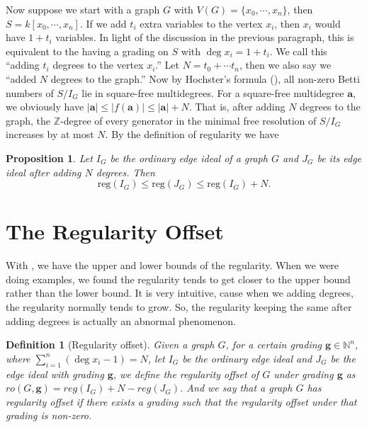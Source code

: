 \documentclass[dvipsnames,10pt]{article}
\newtheorem{proposition}[theorem]{Proposition}
\newtheorem{defi}[theorem]{Definition}
\begin{document}
Now suppose we start with a graph $G$ with $V(G)=\{x_0,\cdots,x_n\}$, then $S=k[x_0,\cdots,x_n]$. If we add $t_i$ extra variables to the vertex $x_i$, then $x_i$ would have $1+t_i$ variables. In light of the discussion in the previous paragraph, this is equivalent to the having a grading on $S$ with $\deg x_i=1+t_i$. We call this ``adding $t_i$ degrees to the vertex $x_i$.'' Let $N=t_0+\cdots t_n$, then we also say we ``added $N$ degrees to the graph.'' Now by Hochster's formula (), all non-zero Betti numbers of $S/I_G$ lie in square-free multidegrees. For a square-free multidegree $\mathbf{a}$, we obviously have $|\mathbf{a}|\leqslant|f(\mathbf{a})| \leqslant |\mathbf{a}| + N$. That is, after adding $N$ degrees to the graph, the $\mathbb{Z}$-degree of every generator in the minimal free resolution of $S/I_G$ increases by at most $N$. By the definition of regularity we have

\begin{proposition}
    Let $I_G$ be the ordinary edge ideal of a graph $G$ and $J_G$ be its edge ideal after adding $N$ degrees. Then
    \begin{equation*}
        \mathrm{reg}(I_G) \leqslant \mathrm{reg} (J_G) \leqslant \mathrm{reg} (I_G)+N.
    \end{equation*}
\end{proposition}

\section{The Regularity Offset}

With , we have the upper and lower bounds of the regularity. When we were doing examples, we found the regularity tends to get closer to the upper bound rather than the lower bound. It is very intuitive, cause when we adding degrees, the regularity normally tends to grow. So, the regularity keeping the same after adding degrees is actually an abnormal phenomenon.

\begin{defi}[Regularity offset]
   Given a graph $G$, for a certain grading $\mathbf{g}\in\mathbb{N}^n$, where $\sum_{i=1}^{n} (\deg x_i-1)=N$, let $I_G$ be the ordinary edge ideal and $J_G$ be the edge ideal with grading $\mathbf{g}$, we define the regularity offset of $G$ under grading $\mathbf{g}$ as $ro(G,\mathbf{g})=reg(I_G)+N-reg(J_G)$. And we say that a graph $G$ has regularity offset if there exists a grading such that the regularity offset under that grading is non-zero.
   
\end{defi}
\end{document}
